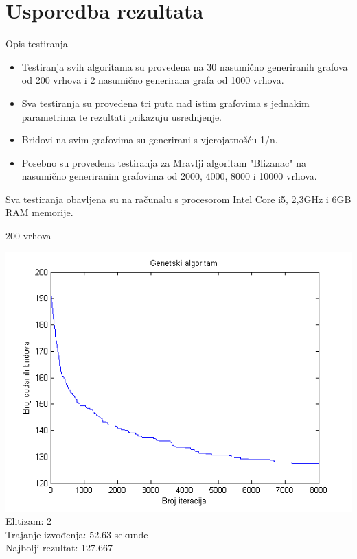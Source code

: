 \documentclass{beamer}
\begin{document}
\section{Usporedba rezultata}
\begin{frame}{Opis testiranja}
\begin{itemize}
\item Testiranja svih algoritama su provedena na 30 nasumično generiranih grafova od 200 vrhova i 2 nasumično generirana grafa od 1000 vrhova.
\item Sva testiranja su provedena tri puta nad istim grafovima s jednakim parametrima te rezultati prikazuju usrednjenje.
\item Bridovi na svim grafovima su generirani s vjerojatnošću 1/n.
\item Posebno su provedena testiranja za Mravlji algoritam "Blizanac" na nasumično generiranim grafovima od 2000, 4000, 8000  i 10000 vrhova.
\end{itemize}

Sva testiranja obavljena su na računalu s procesorom Intel Core i5, 2,3GHz i 6GB RAM memorije.
\end{frame}


\begin{frame}{200 vrhova}
\begin{center}
\includegraphics[scale = 0.55]{par2.png}\\
\tiny
Elitizam: 2\\
Trajanje izvođenja: 52.63 sekunde\\
Najbolji rezultat: 127.667\\
\end{center}
\end{frame}
\end{document}
